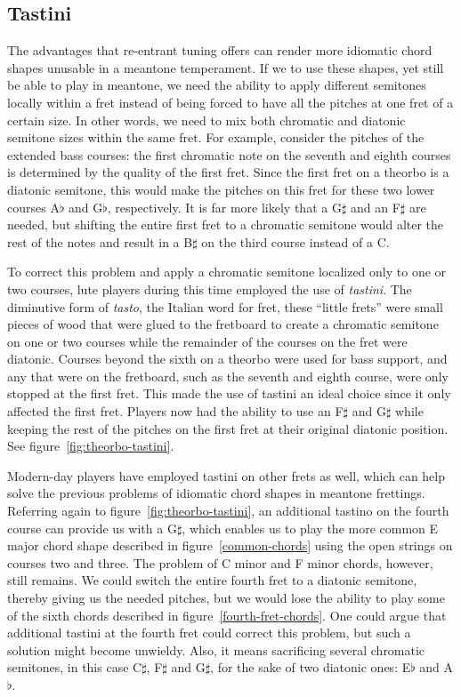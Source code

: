 \subsection{Tastini}

The advantages that re-entrant tuning offers can render more idiomatic chord
shapes unusable in a meantone temperament.  If we to use these shapes, yet still
be able to play in meantone, we need the ability to apply different semitones
locally within a fret instead of being forced to have all the pitches at one
fret of a certain size. In other words, we need to mix both chromatic and
diatonic semitone sizes within the same fret.  For example, consider the pitches
of the extended bass courses: the first chromatic note on the seventh and eighth
courses is determined by the quality of the first fret.  Since the first fret on
a theorbo is a diatonic semitone, this would make the pitches on this fret for
these two lower courses A$\flat$ and G$\flat$, respectively.  It is far more
likely that a G$\sharp$ and an F$\sharp$ are needed, but shifting the entire
first fret to a chromatic semitone would alter the rest of the notes and result
in a B$\sharp$ on the third course instead of a C.

To correct this problem and apply a chromatic semitone localized only to one or two
courses, lute players during this time employed the use of \textit{tastini}.  The
diminutive form of \textit{tasto}, the Italian word for fret, these ``little frets'' were
small pieces of wood that were glued to the fretboard to create a chromatic semitone on
one or two courses while the remainder of the courses on the fret were diatonic.  Courses
beyond the sixth on a theorbo were used for bass support, and any that were on the
fretboard, such as the seventh and eighth course, were only stopped at the first fret.
This made the use of tastini an ideal choice since it only affected the first fret. Players now had
the ability to use an F$\sharp$ and G$\sharp$ while keeping the rest of the pitches on the
first fret at their original diatonic position. See figure~\ref{fig:theorbo-tastini}.



Modern-day players have employed tastini on other frets as well, which
can help solve the previous problems of idiomatic chord shapes in meantone frettings.
Referring again to figure~\ref{fig:theorbo-tastini}, an additional tastino on the
fourth course can provide us with a G$\sharp$, which enables us to play the more
common E major chord shape described in figure~\ref{common-chords} using the open
strings on courses two and three.  The problem of C minor and F minor chords, however,
still remains.  We could switch the entire fourth fret to a diatonic semitone, thereby giving
us the needed pitches, but we would lose the ability to play some of the
sixth chords described in figure~\ref{fourth-fret-chords}.  One could argue
that additional tastini at the fourth fret could correct this problem, but such a solution
might become unwieldy.  Also, it means sacrificing several chromatic
semitones, in this case C$\sharp$, F$\sharp$ and G$\sharp$, for the sake of two diatonic
ones: E$\flat$ and A$\flat$.

